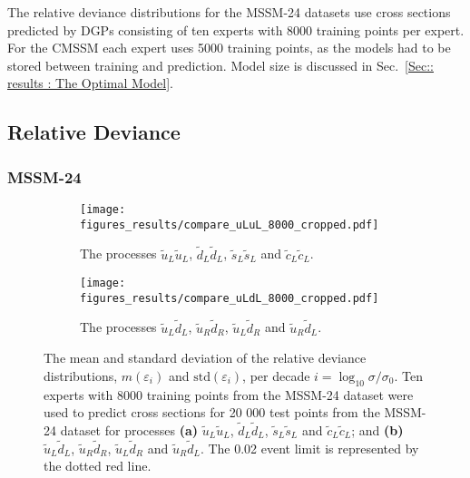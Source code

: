 \documentclass[twoside,english]{uiofysmaster}
\begin{document}
{{The relative deviance distributions for the MSSM-24 datasets use cross sections predicted by DGPs consisting of ten experts with 8000 training points per expert. For the CMSSM each expert uses 5000 training points, as the models had to be stored between training and prediction. Model size is discussed in Sec.~\ref{Sec:: results : The Optimal Model}.

\subsection{Relative Deviance}\label{Sec:: results : Relative Deviance}


\subsubsection{MSSM-24}

\begin{figure}
    \centering
    \begin{subfigure}[b]{0.9\textwidth}
        \texttt{[image: figures\_results/compare\_uLuL\_8000\_cropped.pdf]}
        \caption{The processes $\widetilde{u}_L \widetilde{u}_L$, $\widetilde{d}_L \widetilde{d}_L$, $\widetilde{s}_L \widetilde{s}_L$ and $\widetilde{c}_L \widetilde{c}_L$.}
        \label{Fig:: results : RD MSSM-24 uLuL}
    \end{subfigure}
    \begin{subfigure}[b]{0.9\textwidth}
        \texttt{[image: figures\_results/compare\_uLdL\_8000\_cropped.pdf]}
        \caption{The processes $\widetilde{u}_L\widetilde{d}_L$, $\widetilde{u}_R\widetilde{d}_R$, $\widetilde{u}_L\widetilde{d}_R$ and $\widetilde{u}_R\widetilde{d}_L$.}
        \label{Fig :: results : RD MSSM-24 uLdL}
    \end{subfigure}
    \caption{The mean and standard deviation of the relative deviance distributions, $m(\varepsilon_i)$ and $\mathrm{std}(\varepsilon_i)$, per decade $i =\log_{10} \sigma / \sigma_0$. Ten experts with 8000 training points from the MSSM-24 dataset were used to predict cross sections for 20 000 test points from the MSSM-24 dataset for processes \textbf{(a)}  $\widetilde{u}_L \widetilde{u}_L$, $\widetilde{d}_L \widetilde{d}_L$, $\widetilde{s}_L \widetilde{s}_L$ and $\widetilde{c}_L \widetilde{c}_L$; and \textbf{(b)} $\widetilde{u}_L\widetilde{d}_L$, $\widetilde{u}_R\widetilde{d}_R$, $\widetilde{u}_L\widetilde{d}_R$ and $\widetilde{u}_R\widetilde{d}_L$. The 0.02 event limit is represented by the dotted red line.}
\label{Fig:: results : RD MSSM-24}
\end{figure}

}}
\end{document}
